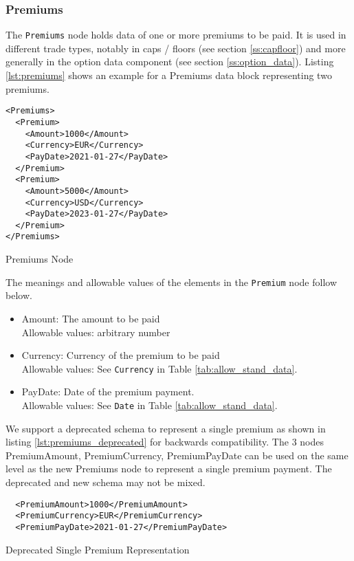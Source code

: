 \subsubsection{Premiums}
\label{ss:premiums}

The \lstinline!Premiums! node holds data of one or more premiums to be paid. It is used in different trade types,
notably in caps / floors (see section \ref{ss:capfloor}) and more generally in the option data component (see section
\ref{ss:option_data}). Listing \ref{lst:premiums} shows an example for a Premiums data block representing two premiums.

\begin{listing}[H]
\begin{verbatim}
<Premiums>
  <Premium>
    <Amount>1000</Amount>
    <Currency>EUR</Currency>
    <PayDate>2021-01-27</PayDate>
  </Premium>
  <Premium>
    <Amount>5000</Amount>
    <Currency>USD</Currency>
    <PayDate>2023-01-27</PayDate>
  </Premium>
</Premiums>
\end{verbatim}
\caption{Premiums Node}
\label{lst:premiums}
\end{listing}

The meanings and allowable values of the elements in the \lstinline!Premium! node follow below.

\begin{itemize}
\item Amount: The amount to be paid \\
  Allowable values: arbitrary number
\item Currency: Currency of the premium to be paid\\
  Allowable values:  See \lstinline!Currency! in Table \ref{tab:allow_stand_data}.
\item PayDate: Date of the premium payment.\\
  Allowable values:  See \lstinline!Date! in Table \ref{tab:allow_stand_data}.
\end{itemize}

We support a deprecated schema to represent a single premium as shown in listing \ref{lst:premiums_deprecated} for
backwards compatibility. The $3$ nodes PremiumAmount, PremiumCurrency, PremiumPayDate can be used on the same level as
the new Premiums node to represent a single premium payment. The deprecated and new schema may not be mixed.

\begin{listing}[H]
\begin{verbatim}
  <PremiumAmount>1000</PremiumAmount>
  <PremiumCurrency>EUR</PremiumCurrency>
  <PremiumPayDate>2021-01-27</PremiumPayDate>
\end{verbatim}
\caption{Deprecated Single Premium Representation}
\label{lst:premiums_deprecated}
\end{listing}
